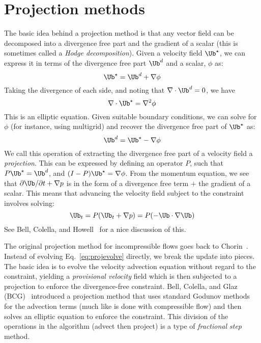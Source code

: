 \section{Projection methods}

The basic idea behind a projection method is that any vector field
can be decomposed into a divergence free part and the gradient of
a scalar (this is sometimes called a {\em Hodge decomposition}).
Given a velocity field $\Ub^\star$, we can express it in terms of the
divergence free part $\Ub^d$ and a scalar, $\phi$ as:
\begin{equation}
\Ub^\star = \Ub^d + \nabla \phi
\end{equation}
Taking the divergence of each side, and noting that $\nabla \cdot \Ub^d
= 0$, we have
\begin{equation}
\nabla \cdot \Ub^\star = \nabla^2 \phi
\end{equation}
This is an elliptic equation.  Given suitable boundary conditions, we
can solve for $\phi$ (for instance, using multigrid) and recover the
divergence free part of $\Ub^\star$ as:
\begin{equation}
\Ub^d = \Ub^\star - \nabla \phi
\end{equation}
We call this operation of extracting the divergence free part of a
velocity field a {\em projection}.  This can be expressed by defining
an operator $P$, such that $P\Ub^\star = \Ub^d$, and $(I - P)\Ub^\star =
\nabla \phi$.  From the momentum equation, we see that $\partial
\Ub/\partial t + \nabla p$ is in the form of a divergence free term
$+$ the gradient of a scalar.  This means that advancing the velocity
field subject to the constraint involves solving:
\begin{equation}
\Ub_t = P(\Ub_t + \nabla p) = P(-\Ub\cdot \nabla \Ub)
\label{eq:projevolve}
\end{equation}
See Bell, Colella, and Howell~\cite{BCH} for a nice discussion of this.

The original projection method for incompressible flows goes back to
Chorin~\cite{chorin:1968}.  Instead of evolving
Eq.~\ref{eq:projevolve} directly, we break the update into pieces.
The basic idea is to evolve the velocity advection equation without
regard to the constraint, yielding a {\em provisional velocity} field
which is then subjected to a projection to enforce the divergence-free
constraint.  Bell, Colella, and Glaz (BCG)~\cite{BCG} introduced a projection
method that uses standard Godunov methods for the advection terms
(much like is done with compressible flow) and then solves an elliptic
equation to enforce the constraint.  This division of the operations
in the algorithm (advect then project) is a type of {\em fractional
  step} method.

